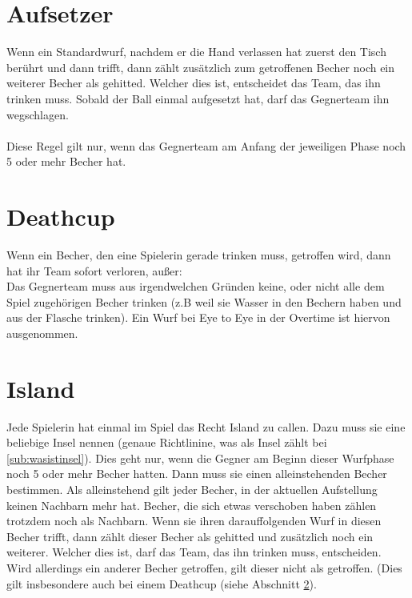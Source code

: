 \documentclass[a5paper, 12pt]{book}
\begin{document}
\section{Aufsetzer}\label{sec:aufsetzer}
Wenn ein Standardwurf, nachdem er die Hand verlassen hat zuerst den Tisch berührt und dann trifft, dann zählt zusätzlich zum getroffenen Becher noch ein weiterer Becher als gehitted. Welcher dies ist, entscheidet das Team, das ihn trinken muss. Sobald der Ball einmal aufgesetzt hat, darf das Gegnerteam ihn wegschlagen.\\\\
Diese Regel gilt nur, wenn das Gegnerteam am Anfang der jeweiligen Phase noch 5 oder mehr Becher hat.\\


\section{Deathcup}\label{sec:deathcup}
Wenn ein Becher, den eine Spielerin gerade trinken muss, getroffen wird, dann hat ihr Team sofort verloren, außer:\\
Das Gegnerteam muss aus irgendwelchen Gründen keine, oder nicht alle dem Spiel zugehörigen Becher trinken (z.B weil sie Wasser in den Bechern haben und aus der Flasche trinken). Ein Wurf bei Eye to Eye in der Overtime ist hiervon ausgenommen.\\
\section{Island}\label{sec:island}
Jede Spielerin hat einmal im Spiel das Recht Island zu callen. Dazu muss sie eine beliebige Insel nennen (genaue Richtlinine, was als Insel zählt bei \ref{sub:wasistinsel}). Dies geht nur, wenn die Gegner am Beginn dieser Wurfphase noch 5 oder mehr Becher hatten. Dann muss sie einen alleinstehenden Becher bestimmen. Als alleinstehend gilt jeder Becher, in der aktuellen Aufstellung keinen Nachbarn mehr hat. Becher, die sich etwas verschoben haben zählen trotzdem noch als Nachbarn. Wenn sie ihren darauffolgenden Wurf in diesen Becher trifft, dann zählt dieser Becher als gehitted und zusätzlich noch ein weiterer. Welcher dies ist, darf das Team, das ihn trinken muss, entscheiden.\\
Wird allerdings ein anderer Becher getroffen, gilt dieser nicht als getroffen. (Dies gilt insbesondere auch bei einem Deathcup (siehe Abschnitt \ref{sec:deathcup}).
\end{document}

